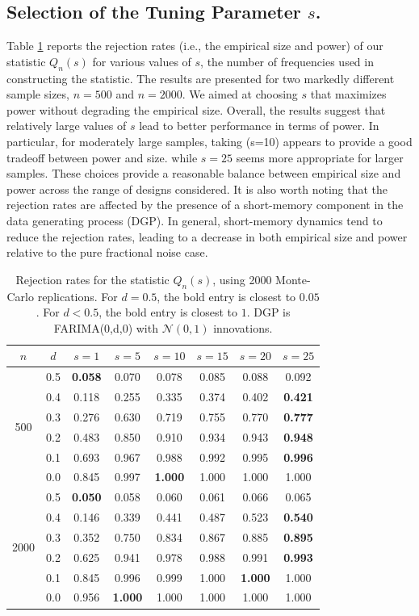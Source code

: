 \documentclass[10pt,a4paper]{amsart}
\numberwithin{equation}{section}
\begin{document}
\subsection{Selection of the Tuning Parameter $s$.}
Table \ref{tab:sum_compare} reports the rejection rates (i.e., the empirical size and power) of our statistic \(Q_n(s)\) for various values of \(s\), the number of frequencies used in constructing the statistic. The results are presented for two markedly different sample sizes, \(n=500\) and \(n=2000\).
We aimed at choosing $s$ that maximizes power without degrading the empirical size.
Overall, the results suggest that relatively large values of \(s\) lead to better performance in terms of power. In particular, for moderately large samples, taking (s=10) appears to provide a good tradeoff between power and size.
while \(s=25\) seems more appropriate for larger samples. These choices provide a reasonable balance between empirical size and power across the range of designs considered.
It is also worth noting that the rejection rates are affected by the presence of a short-memory component in the data generating process (DGP). In general, short-memory dynamics tend to reduce the rejection rates, leading to a decrease in both empirical size and power relative to the pure fractional noise case.
% 
\begin{table}[H]
\centering
\caption{Rejection rates for the statistic $Q_n(s)$, using 2000 Monte-Carlo replications. For $d=0.5$, the bold entry is closest to $0.05$. For $d<0.5$, the bold entry is closest to $1$. DGP is FARIMA(0,d,0) with $\mathcal{N}(0,1)$ innovations.}
\label{tab:sum_compare}
\begin{tabular}{cccccccc}
\hline
$n$ & $d$ & $s=1$ & $s=5$ & $s=10$ & $s=15$ & $s=20$ & $s=25$ \\
\hline
\multirow{6}{*}{500} & 0.5 & \textbf{0.058} & 0.070 & 0.078 & 0.085 & 0.088 & 0.092 \\
 & 0.4 & 0.118 & 0.255 & 0.335 & 0.374 & 0.402 & \textbf{0.421} \\
 & 0.3 & 0.276 & 0.630 & 0.719 & 0.755 & 0.770 & \textbf{0.777} \\
 & 0.2 & 0.483 & 0.850 & 0.910 & 0.934 & 0.943 & \textbf{0.948} \\
 & 0.1 & 0.693 & 0.967 & 0.988 & 0.992 & 0.995 & \textbf{0.996} \\
 & 0.0 & 0.845 & 0.997 & \textbf{1.000} & 1.000 & 1.000 & 1.000 \\
\hline
\multirow{6}{*}{2000} & 0.5 & \textbf{0.050} & 0.058 & 0.060 & 0.061 & 0.066 & 0.065 \\
 & 0.4 & 0.146 & 0.339 & 0.441 & 0.487 & 0.523 & \textbf{0.540} \\
 & 0.3 & 0.352 & 0.750 & 0.834 & 0.867 & 0.885 & \textbf{0.895} \\
 & 0.2 & 0.625 & 0.941 & 0.978 & 0.988 & 0.991 & \textbf{0.993} \\
 & 0.1 & 0.845 & 0.996 & 0.999 & 1.000 & \textbf{1.000} & 1.000 \\
 & 0.0 & 0.956 & \textbf{1.000} & 1.000 & 1.000 & 1.000 & 1.000 \\
\hline
\end{tabular}
\end{table}
\end{document}
